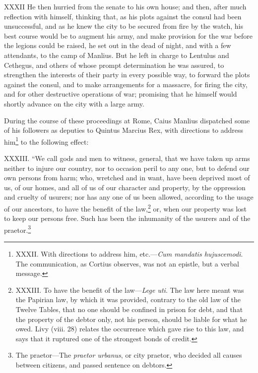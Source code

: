 XXXII He then hurried from the senate to his own house; and then,
after much reflection with himself, thinking that, as his plots
against the consul had been unsuccessful, and as he knew the city to
be secured from fire by the watch, his best course would be to augment
his army, and make provision for the war before the legions could be
raised, he set out in the dead of night, and with a few attendants, to
the camp of Manlius. But he left in charge to Lentulus and Cethegus,
and others of whose prompt determination he was assured, to strengthen
the interests of their party in every possible way, to forward the
plots against the consul, and to make arrangements for a massacre, for
firing the city, and for other destructive operations of war;
promising that he himself would shortly advance on the city with a
large army.

During the course of these proceedings at Rome, Caius Manlius
dispatched some of his followers as deputies to Quintus Marcius Rex,
with directions to address him\footnote{XXXII. With directions to address him, etc.—\emph{Cum mandatis
hujuscemodi}. The communication, as Cortius observes, was not an
epistle, but a verbal message.} to the following effect:

XXXIII. ``We call gods and men to witness, general, that we have taken
up arms neither to injure our country, nor to occasion peril to any
one, but to defend our own persons from harm; who, wretched and in
want, have been deprived most of us, of our homes, and all of us of
our character and property, by the oppression and cruelty of usurers;
nor has any one of us been allowed, according to the usage of our
ancestors, to have the benefit of the law,\footnote{XXXIII. To have the benefit of the law—\emph{Lege uti}. The law
here meant was the Papirian law, by which it was provided, contrary to
the old law of the Twelve Tables, that no one should be confined in
prison for debt, and that the property of the debtor only, not his
person, should be liable for what he owed. Livy (viii. 28) relates the
occurrence which gave rise to this law, and says that it ruptured one
of the strongest bonds of credit.} or, when our property
was lost to keep our persons free. Such has been the inhumanity of the
usurers and of the praetor.\footnote{The praetor—The \emph{praetor urbanus}, or city praetor, who
decided all causes between citizens, and passed sentence on debtors.}

